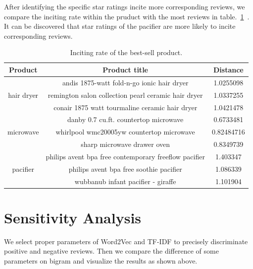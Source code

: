 \documentclass[12pt]{article}%
\begin{document}
After identifying the specific star ratings incite more corresponding reviews, we compare the inciting rate within the pruduct with the most reviews in table.~\ref{biasssso}~. It can be discovered that star ratings of the pacifier are more likely to incite corresponding reviews.
\begin{table}[H]
	\centering
	\caption{Inciting rate of the best-sell product.}	
	\begin{tabular}{c|cc}
		\toprule[1.5pt]
		\multicolumn{1}{m{2cm}}{\centering Product} &
		\multicolumn{1}{m{9cm}}{\centering Product title} & \multicolumn{1}{m{2cm}}{\centering Distance}\\
		\midrule[1pt]
		&andis 1875-watt fold-n-go ionic hair dryer &1.0255098\\
		hair dryer&remington salon collection pearl ceramic hair dryer     & 1.0337255\\
		&conair 1875 watt tourmaline ceramic hair dryer          &1.0421478\\
		\midrule[1pt]
		&danby 0.7 cu.ft. countertop microwave          & 0.6733481\\
		microwave&whirlpool wmc20005yw  countertop microwave          &0.82484716\\
		&sharp microwave drawer oven        &0.8349739\\
				\midrule[1pt]
		&philips avent bpa free contemporary freeflow pacifier        &1.403347\\
		pacifier&philips avent bpa free soothie pacifier       &1.086339\\
		&wubbanub infant pacifier - giraffe&1.101904\\
		\bottomrule[1.6pt]
	\end{tabular}\label{biasssso}
\end{table}


\section{Sensitivity Analysis}

We select proper parameters of Word2Vec and TF-IDF to precisely discriminate positive and negative reviews. Then we compare the difference of some parameters on bigram and visualize the results as shown above.
\end{document}

